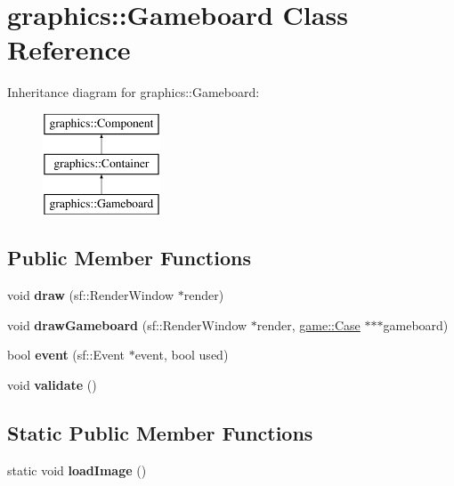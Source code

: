 \hypertarget{classgraphics_1_1_gameboard}{\section{graphics\-:\-:Gameboard Class Reference}
\label{classgraphics_1_1_gameboard}
}
Inheritance diagram for graphics\-:\-:Gameboard\-:\begin{figure}[H]
\begin{center}
\leavevmode
\includegraphics[height=3.000000cm]{classgraphics_1_1_gameboard}
\end{center}
\end{figure}
\subsection*{Public Member Functions}
\begin{DoxyCompactItemize}
\item 
\hypertarget{classgraphics_1_1_gameboard_ae3f1f39117449e0fa94fe1999e0ef427}{void {\bfseries draw} (sf\-::\-Render\-Window $\ast$render)}\label{classgraphics_1_1_gameboard_ae3f1f39117449e0fa94fe1999e0ef427}

\item 
\hypertarget{classgraphics_1_1_gameboard_ad64f30b422cca0e71c4547e54dfaf9bd}{void {\bfseries draw\-Gameboard} (sf\-::\-Render\-Window $\ast$render, \hyperlink{classgame_1_1_case}{game\-::\-Case} $\ast$$\ast$$\ast$gameboard)}\label{classgraphics_1_1_gameboard_ad64f30b422cca0e71c4547e54dfaf9bd}

\item 
\hypertarget{classgraphics_1_1_gameboard_a4d5718725b7d06c5d995e53d01f98104}{bool {\bfseries event} (sf\-::\-Event $\ast$event, bool used)}\label{classgraphics_1_1_gameboard_a4d5718725b7d06c5d995e53d01f98104}

\item 
\hypertarget{classgraphics_1_1_gameboard_af09f29217a0d76bb8f22f7bfddb8d2e6}{void {\bfseries validate} ()}\label{classgraphics_1_1_gameboard_af09f29217a0d76bb8f22f7bfddb8d2e6}

\end{DoxyCompactItemize}
\subsection*{Static Public Member Functions}
\begin{DoxyCompactItemize}
\item 
\hypertarget{classgraphics_1_1_gameboard_a0a61f37e2cc246ce693a49416a223cba}{static void {\bfseries load\-Image} ()}\label{classgraphics_1_1_gameboard_a0a61f37e2cc246ce693a49416a223cba}

\end{DoxyCompactItemize}
